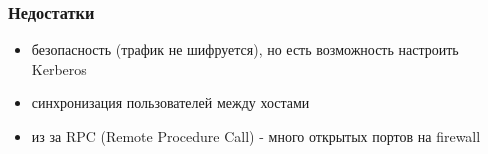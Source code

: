 \begin{frame}
    \frametitle{Недостатки}
    \begin{itemize}
        \item безопасность (трафик не шифруется), но есть возможность настроить Kerberos
        \item синхронизация пользователей между хостами
        \item из за RPC (Remote Procedure Call) - много открытых портов на firewall
    \end{itemize}

\end{frame}